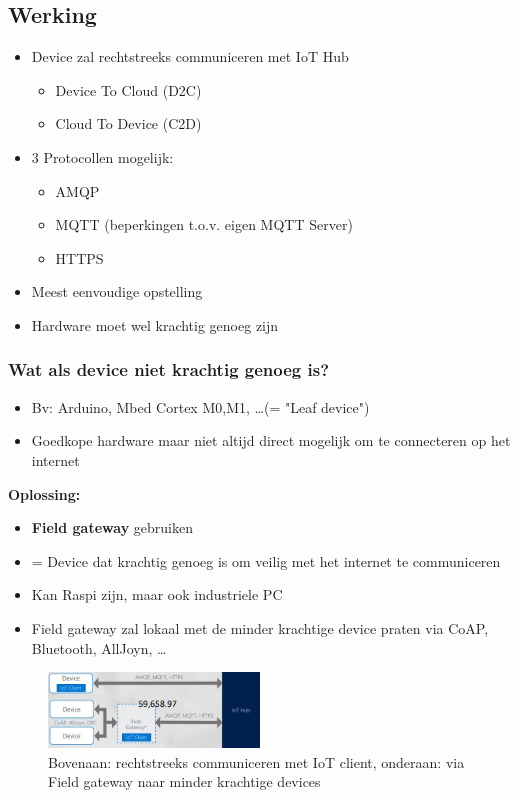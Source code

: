 \documentclass{article}
\newcommand{\bold}[1]{\textbf{#1}}
\begin{document}
\subsection{Werking}

\begin{itemize}
    \item Device zal rechtstreeks communiceren met IoT Hub
    \begin{itemize}
        \item Device To Cloud (D2C)
        \item Cloud To Device (C2D)
    \end{itemize}
    \item 3 Protocollen mogelijk:
    \begin{itemize}
        \item AMQP
        \item MQTT (beperkingen t.o.v. eigen MQTT Server)
        \item HTTPS
    \end{itemize}
    \item Meest eenvoudige opstelling
    \item Hardware moet wel krachtig genoeg zijn
\end{itemize}

\subsubsection{Wat als device niet krachtig genoeg is?}

\begin{itemize}
    \item Bv: Arduino, Mbed Cortex M0,M1, \dots (= "Leaf device")
    \item Goedkope hardware maar niet altijd direct mogelijk om te connecteren op het internet
\end{itemize}

\bold{Oplossing:}
\begin{itemize}
    \item \bold{Field gateway} gebruiken
    \item = Device dat krachtig genoeg is om veilig met het internet te communiceren
    \item Kan Raspi zijn, maar ook industriele PC
    \item Field gateway zal lokaal met de minder krachtige device praten via CoAP, Bluetooth, AllJoyn, \dots
\end{itemize}

\begin{figure}[H]
    \centering
    \includegraphics[width=0.5\textwidth]{iot-hub.png}
    \caption{Bovenaan: rechtstreeks communiceren met IoT client, onderaan: via Field gateway naar minder krachtige devices}
\end{figure}
\end{document}
